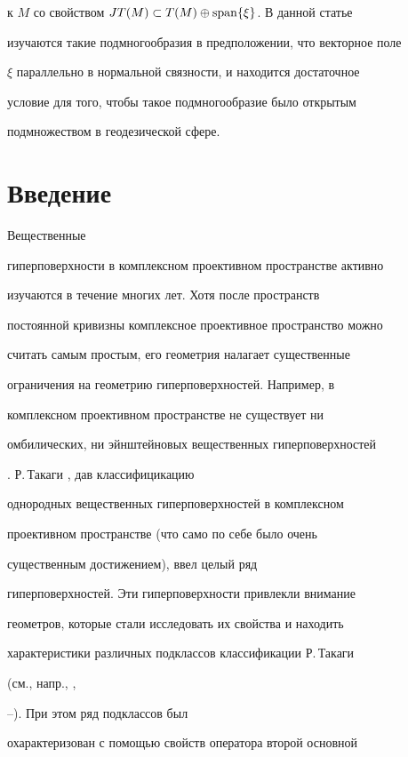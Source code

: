 к $M$ со свойством $JT(M)\subset T(M)\oplus \operatorname{span}\{\xi\}$. В данной статье


изучаются такие подмногообразия в предположении, что векторное поле


$\xi$ параллельно в нормальной связности, и находится достаточное


условие для того, чтобы такое подмногообразие было открытым


подмножеством в геодезической сфере.





\section{Введение}





Вещественные


гиперповерхности в комплексном проективном пространстве активно


изучаются в течение многих лет. Хотя после пространств


постоянной кривизны комплексное проективное пространство можно


считать самым простым, его геометрия налагает существенные


ограничения на геометрию гиперповерхностей. Например, в


комплексном проективном пространстве не существует ни


омбилических, ни эйнштейновых вещественных гиперповерхностей


\cite{CecilRyan}. Р.\,Такаги \cite{Takagi}, дав классифицикацию


однородных вещественных гиперповерхностей в комплексном


проективном пространстве (что само по себе было очень


существенным достижением), ввел целый ряд


гиперповерхностей. Эти гиперповерхности привлекли внимание


геометров, которые стали исследовать их свойства и находить


характеристики различных подклассов классификации Р.\,Такаги


(см., напр., \cite{CecilRyan},


\cite{Kim}--\cite{Oktrans}). При этом ряд подклассов был


охарактеризован с помощью свойств оператора второй основной



